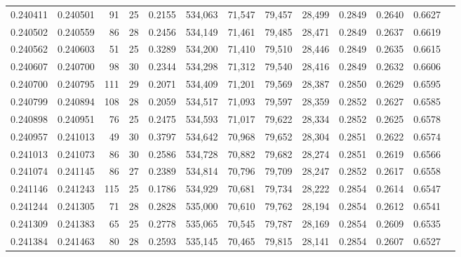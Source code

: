 \begin{tabular}{rrrrrrrrrrrrr}
0.240411 & 0.240501 &  91 &  25 &                                     0.2155 & 534,063 &  71,547 &  79,457 &  28,499 & 0.2849 & 0.2640 & 0.6627 \\
0.240502 & 0.240559 &  86 &  28 &                                     0.2456 & 534,149 &  71,461 &  79,485 &  28,471 & 0.2849 & 0.2637 & 0.6619 \\
0.240562 & 0.240603 &  51 &  25 &                                     0.3289 & 534,200 &  71,410 &  79,510 &  28,446 & 0.2849 & 0.2635 & 0.6615 \\
0.240607 & 0.240700 &  98 &  30 &                                     0.2344 & 534,298 &  71,312 &  79,540 &  28,416 & 0.2849 & 0.2632 & 0.6606 \\
0.240700 & 0.240795 & 111 &  29 &                                     0.2071 & 534,409 &  71,201 &  79,569 &  28,387 & 0.2850 & 0.2629 & 0.6595 \\
0.240799 & 0.240894 & 108 &  28 &                                     0.2059 & 534,517 &  71,093 &  79,597 &  28,359 & 0.2852 & 0.2627 & 0.6585 \\
0.240898 & 0.240951 &  76 &  25 &                                     0.2475 & 534,593 &  71,017 &  79,622 &  28,334 & 0.2852 & 0.2625 & 0.6578 \\
0.240957 & 0.241013 &  49 &  30 &                                     0.3797 & 534,642 &  70,968 &  79,652 &  28,304 & 0.2851 & 0.2622 & 0.6574 \\
0.241013 & 0.241073 &  86 &  30 &                                     0.2586 & 534,728 &  70,882 &  79,682 &  28,274 & 0.2851 & 0.2619 & 0.6566 \\
0.241074 & 0.241145 &  86 &  27 &                                     0.2389 & 534,814 &  70,796 &  79,709 &  28,247 & 0.2852 & 0.2617 & 0.6558 \\
0.241146 & 0.241243 & 115 &  25 &                                     0.1786 & 534,929 &  70,681 &  79,734 &  28,222 & 0.2854 & 0.2614 & 0.6547 \\
0.241244 & 0.241305 &  71 &  28 &                                     0.2828 & 535,000 &  70,610 &  79,762 &  28,194 & 0.2854 & 0.2612 & 0.6541 \\
0.241309 & 0.241383 &  65 &  25 &                                     0.2778 & 535,065 &  70,545 &  79,787 &  28,169 & 0.2854 & 0.2609 & 0.6535 \\
0.241384 & 0.241463 &  80 &  28 &                                     0.2593 & 535,145 &  70,465 &  79,815 &  28,141 & 0.2854 & 0.2607 & 0.6527 \\

\end{tabular}
